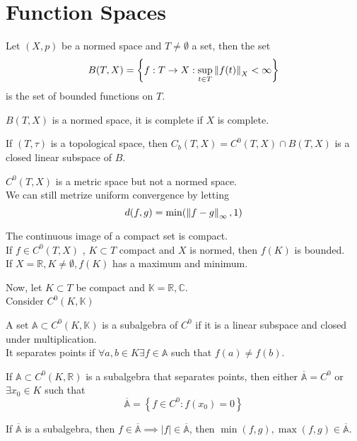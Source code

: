 \documentclass[../main.tex]{subfiles}
\begin{document}
\section{Function Spaces}
\begin{defn}
	Let $( X,p) $ be a normed space and $T\neq \emptyset$ a set, then the set 
	\[ 
	B( T,X) = \left\{ f:T\to X : \sup_{t\in T} \left\lVert f( t) \right\rVert _X < \infty \right\} 
	\]
	is the set of bounded functions on $T$.
\end{defn}
\begin{lemma}
$B( T,X) $ is a normed space, it is complete if $X$ is complete.
\end{lemma}
\begin{lemma}
If $( T,\tau) $ is a topological space, then $C_b( T,X) = C^{0}( T,X) \cap B( T,X) $ is a closed linear subspace of $B$.\\
\end{lemma}
\begin{rmq}
$C^{0}( T,X) $ is a metric space but not a normed space.\\
We can still metrize uniform convergence by letting
\[ 
d( f,g) =\min (\left\lVert f-g\right\rVert _{ \infty } , 1) 
\]
\end{rmq}
\begin{lemma}
The continuous image of a compact set is compact.\\
If $f \in C^{0}( T,X) $ , $K \subset T$ compact and $X$ is normed, then $f( K) $ is bounded.\\
If $X= \mathbb{R}, K \neq \emptyset,f( K) $ has a maximum and minimum.
\end{lemma}
Now, let $K \subset T$ be compact and $\mathbb{K}= \mathbb{R}, \mathbb{C}$.\\
Consider $C^{0}( K, \mathbb{K}) $ 
\begin{defn}
	A set $\mathbb{A} \subset C^{0}( K, \mathbb{K}) $ is a subalgebra of $C^{0}$ if it is a linear subspace and closed under multiplication.\\
	It separates points if $\forall a,b \in K \exists f \in \mathbb{A}$ such that $f( a) \neq f( b) $.
\end{defn}
\begin{thm}
	If $ \mathbb{A}\subset C^{0}( K, \mathbb{R}) $ is a subalgebra that separates points, then either $ \overline{ \mathbb{A}}= C^{0}$ or $\exists x_0 \in K$ such that
	\[ 
		\overline{ \mathbb{A}} = \left\{ f\in C^{0}: f( x_0) =0 \right\} 
	\]
	
\end{thm}
\begin{lemma}
If $ \overline{\mathbb{A}}$ is a subalgebra, then $f \in \overline{\mathbb{A}}\implies |f|\in \overline{\mathbb{A}}$, then $ \min( f,g) , \max( f,g) \in \overline{\mathbb{A}}$.
\end{lemma}
\end{document}
